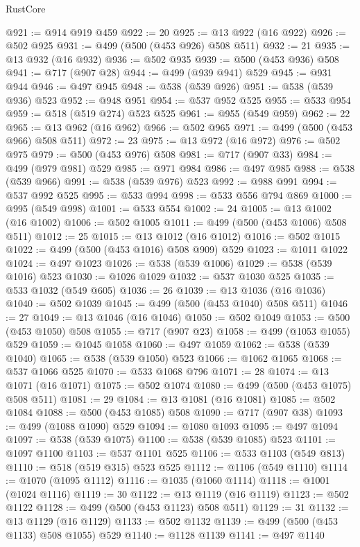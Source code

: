 \begin{lexlean}{RustCore}
\begin{coremodule}
@921 := @914 @919 @459
@922 := 20
@925 := @13 @922 (@16 @922)
@926 := @502 @925
@931 := @499 (@500 (@453 @926) @508 @511)
@932 := 21
@935 := @13 @932 (@16 @932)
@936 := @502 @935
@939 := @500 (@453 @936) @508
@941 := @717 (@907 @28)
@944 := @499 (@939 @941) @529
@945 := @931 @944
@946 := @497 @945
@948 := @538 (@539 @926)
@951 := @538 (@539 @936) @523
@952 := @948 @951
@954 := @537 @952 @525
@955 := @533 @954
@959 := @518 (@519 @274) @523 @525
@961 := @955 (@549 @959)
@962 := 22
@965 := @13 @962 (@16 @962)
@966 := @502 @965
@971 := @499 (@500 (@453 @966) @508 @511)
@972 := 23
@975 := @13 @972 (@16 @972)
@976 := @502 @975
@979 := @500 (@453 @976) @508
@981 := @717 (@907 @33)
@984 := @499 (@979 @981) @529
@985 := @971 @984
@986 := @497 @985
@988 := @538 (@539 @966)
@991 := @538 (@539 @976) @523
@992 := @988 @991
@994 := @537 @992 @525
@995 := @533 @994
@998 := @533 @556 @794 @869
@1000 := @995 (@549 @998)
@1001 := @533 @554
@1002 := 24
@1005 := @13 @1002 (@16 @1002)
@1006 := @502 @1005
@1011 := @499 (@500 (@453 @1006) @508 @511)
@1012 := 25
@1015 := @13 @1012 (@16 @1012)
@1016 := @502 @1015
@1022 := @499 (@500 (@453 @1016) @508 @909) @529
@1023 := @1011 @1022
@1024 := @497 @1023
@1026 := @538 (@539 @1006)
@1029 := @538 (@539 @1016) @523
@1030 := @1026 @1029
@1032 := @537 @1030 @525
@1035 := @533 @1032 (@549 @605)
@1036 := 26
@1039 := @13 @1036 (@16 @1036)
@1040 := @502 @1039
@1045 := @499 (@500 (@453 @1040) @508 @511)
@1046 := 27
@1049 := @13 @1046 (@16 @1046)
@1050 := @502 @1049
@1053 := @500 (@453 @1050) @508
@1055 := @717 (@907 @23)
@1058 := @499 (@1053 @1055) @529
@1059 := @1045 @1058
@1060 := @497 @1059
@1062 := @538 (@539 @1040)
@1065 := @538 (@539 @1050) @523
@1066 := @1062 @1065
@1068 := @537 @1066 @525
@1070 := @533 @1068 @796
@1071 := 28
@1074 := @13 @1071 (@16 @1071)
@1075 := @502 @1074
@1080 := @499 (@500 (@453 @1075) @508 @511)
@1081 := 29
@1084 := @13 @1081 (@16 @1081)
@1085 := @502 @1084
@1088 := @500 (@453 @1085) @508
@1090 := @717 (@907 @38)
@1093 := @499 (@1088 @1090) @529
@1094 := @1080 @1093
@1095 := @497 @1094
@1097 := @538 (@539 @1075)
@1100 := @538 (@539 @1085) @523
@1101 := @1097 @1100
@1103 := @537 @1101 @525
@1106 := @533 @1103 (@549 @813)
@1110 := @518 (@519 @315) @523 @525
@1112 := @1106 (@549 @1110)
@1114 := @1070 (@1095 @1112)
@1116 := @1035 (@1060 @1114)
@1118 := @1001 (@1024 @1116)
@1119 := 30
@1122 := @13 @1119 (@16 @1119)
@1123 := @502 @1122
@1128 := @499 (@500 (@453 @1123) @508 @511)
@1129 := 31
@1132 := @13 @1129 (@16 @1129)
@1133 := @502 @1132
@1139 := @499 (@500 (@453 @1133) @508 @1055) @529
@1140 := @1128 @1139
@1141 := @497 @1140

\end{coremodule}
\end{lexlean}
